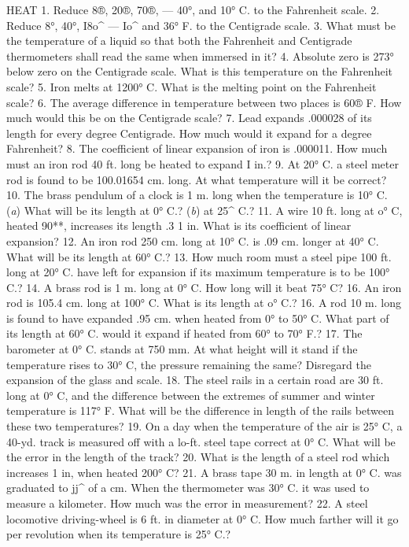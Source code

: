 HEAT
1. Reduce 8®, 20®, 70®, — 40°, and 10° C. to the Fahrenheit scale.
2. Reduce 8°, 40°, I8o^ — Io^ and 36° F. to the Centigrade scale.
3. What must be the temperature of a liquid so that both the Fahrenheit and Centigrade thermometers shall read the same when immersed in it?
4. Absolute zero is 273° below zero on the Centigrade scale. What is this temperature on the Fahrenheit scale?
5. Iron melts at 1200° C. What is the melting point on the Fahrenheit scale?
6. The average difference in temperature between two places is 60® F. How much would this be on the Centigrade scale?
7. Lead expands .000028 of its length for every degree Centigrade. How much would it expand for a degree Fahrenheit?
8. The coefficient of linear expansion of iron is .000011. How much must an iron rod 40 ft. long be heated to expand I in.?
9. At 20° C. a steel meter rod is found to be 100.01654 cm. long. At what temperature will it be correct?
10. The brass pendulum of a clock is 1 m. long when the temperature is 10° C. (\emph{a}) What will be its length at 0° C.? (\emph{b}) at 25^ C.?
11. A wire 10 ft. long at o° C, heated 90**, increases its length .3 1 in. What is its coefficient of linear expansion?
12. An iron rod 250 cm. long at 10° C. is .09 cm. longer at 40° C. What will be its length at 60° C.?
13. How much room must a steel pipe 100 ft. long at 20° C. have left for expansion if its maximum temperature is to be 100° C.?
14. A brass rod is 1 m. long at 0° C. How long will it beat 75° C?
16. An iron rod is 105.4 cm. long at 100° C. What is its length at o° C.?
16. A rod 10 m. long is found to have expanded .95 cm. when heated from 0° to 50° C. What part of its length at 60° C. would it expand if heated from 60° to 70° F.?
17. The barometer at 0° C. stands at 750 mm. At what height will it stand if the temperature rises to 30° C, the pressure remaining the same? Disregard the expansion of the glass and scale.
18. The steel rails in a certain road are 30 ft. long at 0° C, and the difference between the extremes of summer and winter temperature is 117° F. What will be the difference in length of the rails between these two temperatures?
19. On a day when the temperature of the air is 25° C, a 40-yd. track is measured off with a lo-ft. steel tape correct at 0° C. What will be the error in the length of the track?
20. What is the length of a steel rod which increases 1 in, when heated 200° C?
21. A brass tape 30 m. in length at 0° C. was graduated to jj^ of a cm. When the thermometer was 30° C. it was used to measure a kilometer. How much was the error in measurement?
22. A steel locomotive driving-wheel is 6 ft. in diameter at 0° C. How much farther will it go per revolution when its temperature is 25° C.?
